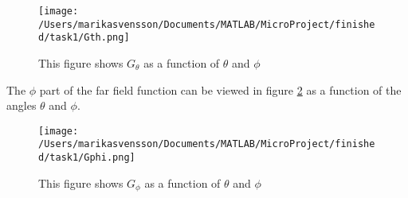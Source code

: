 \begin{figure}[h]
\centering
\texttt{[image: /Users/marikasvensson/Documents/MATLAB/MicroProject/finished/task1/Gth.png]}
\caption{This figure shows $G_\theta$ as a function of $\theta$ and $\phi$}
\label{task1:Gth}
\end{figure}


The $\phi$ part of the far field function can be viewed in figure \ref{task1:Gphi} as a function of the angles $\theta$ and $\phi$.


\begin{figure}[h]
\centering
\texttt{[image: /Users/marikasvensson/Documents/MATLAB/MicroProject/finished/task1/Gphi.png]}
\caption{This figure shows $G_\phi$ as a function of $\theta$ and $\phi$}
\label{task1:Gphi}
\end{figure}



